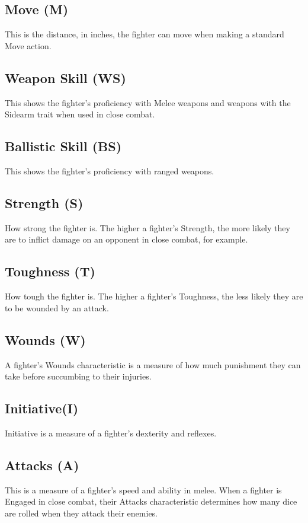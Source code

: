 \begin{multicols}{2}

\subsection{Move (M)}
This is the distance, in inches, the fighter can move when making a standard Move action.

\subsection{Weapon Skill (WS)}
This shows the fighter’s proficiency with Melee weapons and weapons with the Sidearm trait when used in close combat.

\subsection{Ballistic Skill (BS)}
This shows the fighter’s proficiency with ranged weapons.

\subsection{Strength (S)}
How strong the fighter is.
The higher a fighter’s Strength, the more likely they are to inflict damage on an opponent in close combat, for example.

\subsection{Toughness (T)}
How tough the fighter is.
The higher a fighter’s Toughness, the less likely they are to be wounded by an attack.

\subsection{Wounds (W)}
A fighter’s Wounds characteristic is a measure of how much punishment they can take before succumbing to their injuries.

\subsection{Initiative(I)}
Initiative is a measure of a fighter’s dexterity and reflexes.

\subsection{Attacks (A)}
This is a measure of a fighter’s speed and ability in melee.
When a fighter is Engaged in close combat, their Attacks characteristic determines how many dice are rolled when they attack their enemies.


\end{multicols}
